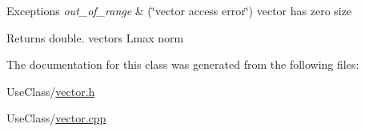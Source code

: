 \begin{DoxyExceptions}{Exceptions}
{\em out\+\_\+of\+\_\+range} & (\char`\"{}vector access error\char`\"{}) vector has zero size \\
\hline
\end{DoxyExceptions}
\begin{DoxyReturn}{Returns}
double. vectors Lmax norm 
\end{DoxyReturn}


The documentation for this class was generated from the following files\+:\begin{DoxyCompactItemize}
\item 
Use\+Class/\hyperlink{vector_8h}{vector.\+h}\item 
Use\+Class/\hyperlink{vector_8cpp}{vector.\+cpp}\end{DoxyCompactItemize}
